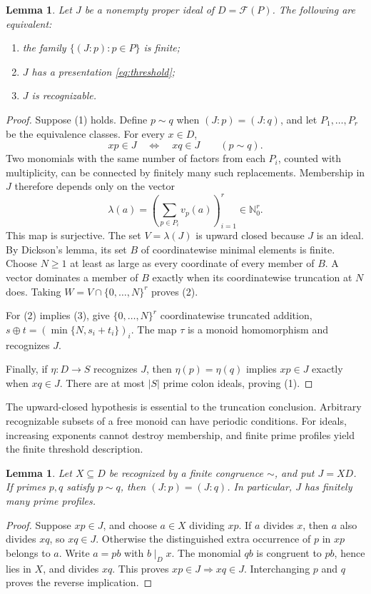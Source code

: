 \documentclass[11pt]{article}
\newtheorem{lemma}[theorem]{Lemma}
\theoremstyle{definition}
\newcommand{\F}{\mathcal F}
\begin{document}
\begin{lemma}\label{lem:profiles}
Let $J$ be a nonempty proper ideal of $D=\F(P)$. The following are equivalent:
\begin{enumerate}
\item the family $\{(J:p):p\in P\}$ is finite;
\item $J$ has a presentation \eqref{eq:threshold};
\item $J$ is recognizable.
\end{enumerate}
\end{lemma}
\begin{proof}
Suppose (1) holds. Define $p\sim q$ when $(J:p)=(J:q)$, and let $P_1,\ldots,P_r$ be the equivalence classes. For every $x\in D$,
\begin{equation}\label{eq:exchange}
 xp\in J\quad\Longleftrightarrow\quad xq\in J\qquad(p\sim q).
\end{equation}
Two monomials with the same number of factors from each $P_i$, counted with multiplicity, can be connected by finitely many such replacements. Membership in $J$ therefore depends only on the vector
\[
 \lambda(a)=\left(\sum_{p\in P_i}v_p(a)\right)_{i=1}^r\in\mathbb N_0^r.
\]
This map is surjective. The set $V=\lambda(J)$ is upward closed because $J$ is an ideal. By Dickson's lemma, its set $B$ of coordinatewise minimal elements is finite. Choose $N\ge1$ at least as large as every coordinate of every member of $B$. A vector dominates a member of $B$ exactly when its coordinatewise truncation at $N$ does. Taking $W=V\cap\{0,\ldots,N\}^r$ proves (2).

For (2) implies (3), give $\{0,\ldots,N\}^r$ coordinatewise truncated addition, $s\oplus t=(\min\{N,s_i+t_i\})_i$. The map $\tau$ is a monoid homomorphism and recognizes $J$.

Finally, if $\eta:D\to S$ recognizes $J$, then $\eta(p)=\eta(q)$ implies $xp\in J$ exactly when $xq\in J$. There are at most $|S|$ prime colon ideals, proving (1).
\end{proof}

The upward-closed hypothesis is essential to the truncation conclusion. Arbitrary recognizable subsets of a free monoid can have periodic conditions. For ideals, increasing exponents cannot destroy membership, and finite prime profiles yield the finite threshold description.

\begin{lemma}\label{lem:upward}
Let $X\subseteq D$ be recognized by a finite congruence $\sim$, and put $J=XD$. If primes $p,q$ satisfy $p\sim q$, then $(J:p)=(J:q)$. In particular, $J$ has finitely many prime profiles.
\end{lemma}
\begin{proof}
Suppose $xp\in J$, and choose $a\in X$ dividing $xp$. If $a$ divides $x$, then $a$ also divides $xq$, so $xq\in J$. Otherwise the distinguished extra occurrence of $p$ in $xp$ belongs to $a$. Write $a=pb$ with $b\mid_D x$. The monomial $qb$ is congruent to $pb$, hence lies in $X$, and divides $xq$. This proves $xp\in J\Rightarrow xq\in J$. Interchanging $p$ and $q$ proves the reverse implication.
\end{proof}
\end{document}
